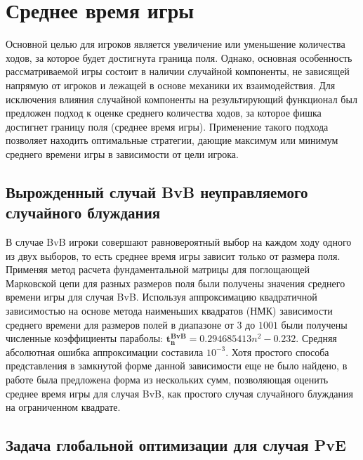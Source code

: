 \section{Среднее время игры}\label{sec:ch3/sec1}

Основной целью для игроков является увеличение или уменьшение количества ходов, за которое будет достигнута граница поля.
Однако, основная особенность рассматриваемой игры состоит в наличии случайной компоненты, не зависящей напрямую от игроков и лежащей в основе механики их взаимодействия.
Для исключения влияния случайной компоненты на результирующий функционал был предложен подход к оценке среднего количества ходов,
за которое фишка достигнет границу поля (среднее время игры).
Применение такого подхода позволяет находить оптимальные стратегии, дающие максимум или минимум среднего времени игры в зависимости от цели игрока.

\subsection{Вырожденный случай BvB неуправляемого случайного блуждания}\label{subsec:ch3/sec1/sub1}

В случае BvB игроки совершают равновероятный выбор на каждом ходу одного из двух выборов, то есть среднее время игры зависит только от размера поля.
Применяя метод расчета фундаментальной матрицы для поглощающей Марковской цепи для разных размеров поля были получены значения среднего времени игры для случая BvB.
Используя аппроксимацию квадратичной зависимостью на основе метода наименьших квадратов (НМК) зависимости среднего времени для размеров полей в диапазоне от $3$ до $1001$
были получены численные коэффициенты параболы: $\boldsymbol{t_n^{BvB}} = 0.294685413 n^2 - 0.232$. Средняя абсолютная ошибка аппроксимации составила $10^{-3}$. 
Хотя простого способа представления в замкнутой форме данной зависимости еще не было найдено, в работе \cite{} была предложена форма из нескольких сумм, позволяющая оценить
среднее время игры для случая BvB, как простого случая случайного блуждания на ограниченном квадрате.

\subsection{Задача глобальной оптимизации для случая PvE}\label{subsec:ch3/sec1/sub1}

